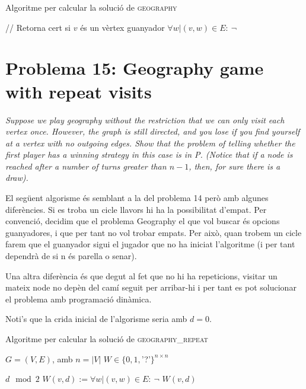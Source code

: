 \documentclass[a4paper]{article}
\begin{document}
\begin{algorithm}[H]
	\caption{Algoritme per calcular la solució de \textsc{geography}}
	\begin{algorithmic}[1]
		\State // Retorna cert si $v$ és un vèrtex guanyador
			\State \Return $\forall w | (v,w) \in E : \ \neg$ 
		\EndFunction
	\end{algorithmic}
\end{algorithm}

\pagebreak
\section{Problema 15: Geography game with repeat visits}
\emph{Suppose we play geography without the restriction that we can only visit each vertex once. However, the graph is still directed, and you lose if you find yourself at a vertex with no outgoing edges. Show that the problem of telling whether the first player has a winning strategy in this case is in P. (Notice that if a node is reached after a number of turns greater than $n − 1$, then, for sure there is a draw).}

El següent algorisme és semblant a la del problema 14 però amb algunes diferències. Si es troba un cicle llavors hi ha la possibilitat d'empat. Per convenció, decidim que el problema Geography el que vol buscar és opcions guanyadores, i que per tant no vol trobar empats. Per això, quan trobem un cicle farem que el guanyador sigui el jugador que no ha iniciat l'algoritme (i per tant dependrà de si n és parella o senar).

Una altra diferència és que degut al fet que no hi ha repeticions, visitar un mateix node no depèn del camí seguit per arribar-hi i per tant es pot solucionar el problema amb programació dinàmica.

Noti's que la crida inicial de l'algorisme seria amb $d=0$.

\begin{algorithm}[H]
	\caption{Algoritme per calcular la solució de \textsc{geography\_repeat}}
	\begin{algorithmic}[1]
		\State $G = (V, E)$, amb $n = |V|$
		\State $W \in \{0,1,$'?'$\}^{n\times n}$

				\State \Return $d \mod 2$
			\EndIf
				\State $W(v,d) := \forall w | (v,w) \in E : \ \neg$ 
			\EndIf
			\State \Return $W(v,d)$
		\EndFunction
	\end{algorithmic}
\end{algorithm}
\end{document}
